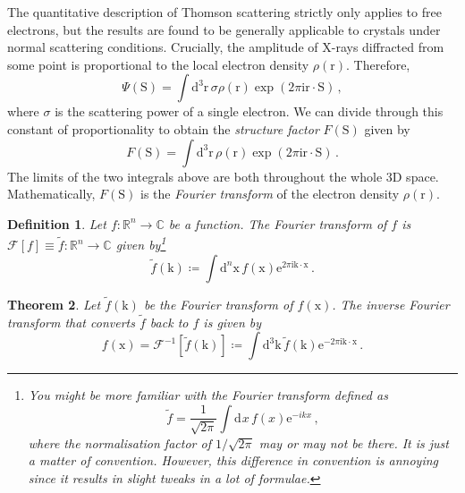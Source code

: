 \documentclass{article}
\theoremstyle{plain}\theoremheaderfont{\normalfont\itshape}\theorembodyfont{\rmfamily}\theoremseparator{.}\newtheorem*{rem}{Remark}\newtheorem*{ex}{Example}\newtheorem*{proof}{Proof}\newtheorem*{altp}{Alternative proof}
\theoremstyle{plain}\theoremheaderfont{\normalfont\bfseries}\theorembodyfont{\rmfamily}\theoremseparator{.}\newtheorem{thm}{Theorem}[section]\newtheorem{lem}[thm]{Lemma}\newtheorem{prop}[thm]{Proposition}\newtheorem*{cor}{Corollary}\newtheorem{defn}[thm]{Definition}\newtheorem{clm}[thm]{Claim}\newtheorem{clminproof}{Claim}\newtheorem*{law}{Law}\newtheorem{pos}[thm]{Postulate}
\theoremstyle{break}\theoremheaderfont{\normalfont\itshape}\theorembodyfont{\rmfamily}\theoremseparator{.\medskip}\newtheorem*{proofskip}{Proof}\newtheorem*{exs}{Examples}\newtheorem*{rems}{Remarks}
\theoremstyle{break}\theoremheaderfont{\normalfont\bfseries}\theorembodyfont{\rmfamily}\theoremseparator{.\medskip}\newtheorem{lemskip}[thm]{Lemma}\newtheorem{defnskip}[thm]{Definition}\newtheorem{propskip}[thm]{Proposition}\newtheorem{thmskip}[thm]{Theorem}
\numberwithin{equation}{section}
\newcommand{\ii}{\mathrm{i}}
\newcommand{\ee}{\mathrm{e}}
\newcommand{\dd}[2][]{\mathrm{d}^{#1} #2\,}
\newcommand{\vb}[1]{\bm{\mathrm{#1}}}
\newcommand{\vdot}{\,\bm{\mathrm{\cdot}}\,}
\begin{document}
    The quantitative description of Thomson scattering strictly only applies to free electrons, but the results are found to be generally applicable to crystals under normal scattering conditions. Crucially, the amplitude of X-rays diffracted from some point is proportional to the local electron density \(\rho(\vb{r})\). Therefore,
    \begin{equation}
        \Psi(\vb{S})=\int\dd[3]{\vb{r}}\sigma\rho(\vb{r})\exp(2\pi \ii\vb{r}\vdot\vb{S})\,,
    \end{equation}
    where \(\sigma\) is the scattering power of a single electron. We can divide through this constant of proportionality to obtain the \textit{structure factor} \(F(\vb{S})\) given by
    \begin{equation}
        F(\vb{S})=\int\dd[3]{\vb{r}}\rho(\vb{r})\exp\left(2\pi \ii\vb{r}\vdot\vb{S}\right)\,.
    \end{equation}
    The limits of the two integrals above are both throughout the whole 3D space. Mathematically, \(F(\vb{S})\) is the \textit{Fourier transform} of the electron density \(\rho(\vb{r})\).
    \begin{defn}
        Let \(f:\mathbb{R}^n\to\mathbb{C}\) be a function. The \textit{Fourier transform} of \(f\) is \(\mathcal{F}[f]\equiv\tilde{f}:\mathbb{R}^n\to\mathbb{C}\) given by\footnote{You might be more familiar with the Fourier transform defined as
        \begin{equation}
            \tilde{f}=\frac{1}{\sqrt{2\pi}}\int\dd{x}f(x)\ee^{-ikx}\,,
        \end{equation}
        where the normalisation factor of \(1/\sqrt{2\pi}\) may or may not be there. It is just a matter of convention. However, this difference in convention is annoying since it results in slight tweaks in a lot of formulae.}
        \begin{equation}
            \tilde{f}(\vb{k})\coloneqq\int\dd[n]{\vb{x}}f(\vb{x})\ee^{2\pi \ii\vb{k}\vdot\vb{x}}\,.
        \end{equation}
    \end{defn}
    \begin{thm}
        Let \(\tilde{f}(\vb{k})\) be the Fourier transform of \(f(\vb{x})\). The \textit{inverse Fourier transform} that converts \(\tilde{f}\) back to \(f\) is given by
        \begin{equation}
            f(\vb{x})=\mathcal{F}^{-1}[\tilde{f}(\vb{k})]\coloneqq\int\dd[3]{\vb{k}}\tilde{f}(\vb{k})\ee^{-2\pi \ii\vb{k}\vdot\vb{x}}\,.
        \end{equation}
    \end{thm}
\end{document}
